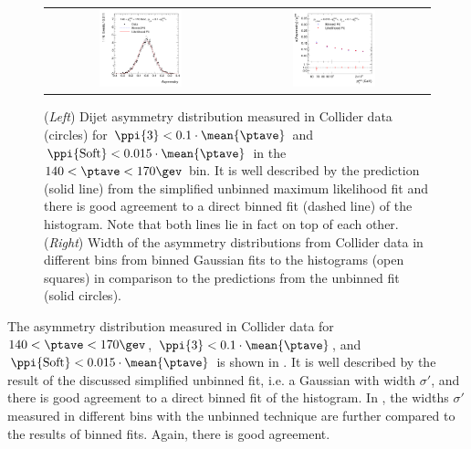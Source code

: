 \begin{figure}[ht]
  \label{fig:ResFit:Asym:Simple}
  \centering
  \begin{tabular}{cc}
    \includegraphics[width=0.45\textwidth]{figures/MaxLikeSimple_Data132440-144011_Eta00-13_PtAsymmetry_PtBin4_Pt3Cut3} &
    \includegraphics[width=0.45\textwidth]{figures/MaxLikeSimple_Data132440-144011_Eta00-13_PtAsymmetryWidthBottomRatio_Pt3Cut3} \\
\end{tabular}
  \caption{(\textit{Left}) Dijet asymmetry distribution measured in
    Collider data (circles) for \mbox{$\ppi{3} < 0.1\cdot\mean{\ptave}$} and \mbox{$\ppi{\text{Soft}} < 0.015\cdot\mean{\ptave}$} in the \mbox{$140 < \ptave < 170\gev$} bin.
    It is well described by the prediction (solid line) from the
    simplified unbinned maximum likelihood fit and there is good agreement to a direct binned
    fit (dashed line) of the histogram.
    Note that both lines lie in fact on top of each other.
    (\textit{Right}) Width of the asymmetry distributions from
    Collider data in different \ptave bins from binned Gaussian fits to the
    histograms (open squares) in comparison to the predictions from
    the unbinned fit (solid circles).}
\end{figure}

The asymmetry distribution measured in Collider data for \mbox{$140 < \ptave < 170\gev$}, \mbox{$\ppi{3} < 0.1\cdot\mean{\ptave}$}, and \mbox{$\ppi{\text{Soft}} < 0.015\cdot\mean{\ptave}$} is shown in .
It is well described by the result of the discussed simplified unbinned fit, i.e. a Gaussian with width $\sigma'$, and there is good agreement to a direct binned fit of the histogram.
In , the widths $\sigma'$ measured in different \ptave bins with the unbinned technique are further compared to the results of binned fits.
Again, there is good agreement.

